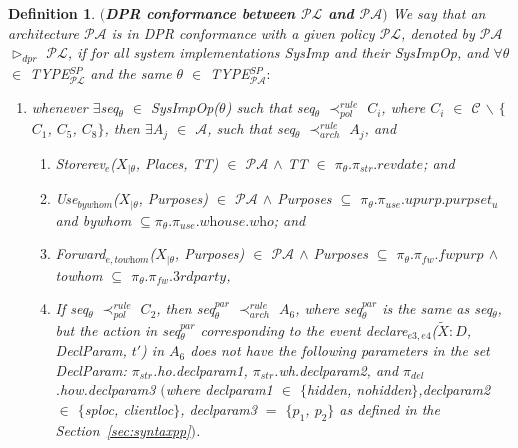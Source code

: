 \documentclass[a4paper]{article}
\newtheorem{ttd}{Definition}
\begin{document}
\begin{ttd}$($\textbf{DPR conformance between $\mathcal{P}\mathcal{L}$ and $\mathcal{P}\mathcal{A}$}$)$
\label{paplconform}
\noindent We say that an architecture $\mathcal{P}\mathcal{A}$ is in DPR conformance with a given policy $\mathcal{P}\mathcal{L}$, denoted by $\mathcal{P}\mathcal{A}$ $\triangleright_{dpr}$ $\mathcal{P}\mathcal{L}$, if for all system implementations \textit{SysImp} and their \textit{SysImpOp},  and $\forall$$\theta$ $\in$ \textit{TYPE}$^{SP}_{\mathcal{P}\mathcal{L}}$ and the same  $\theta$ $\in$ \textit{TYPE}$^{SP}_{\mathcal{P}\mathcal{A}}$$:$
\begin{enumerate}
\item  whenever $\exists$\textit{seq}$_\theta$ $\in$ \textit{SysImpOp}($\theta$) such that \textit{seq}$_\theta$ $\prec^{rule}_{pol}$ $C_i$,  where 
$C_i$ $\in$ $\mathcal{C}$ $\backslash$ $\{$$C_1$, $C_5$, $C_8$$\}$, then 
$\exists$$A_j$ $\in$  $\mathcal{A}$, such that \textit{seq}$_\theta$ $\prec^{rule}_{arch}$ $A_j$, and 

\begin{enumerate}
\item \textit{Storerev}$_{e}$($X_{|\theta}$, \textit{Places}, \textit{TT}) $\in$ $\mathcal{P}\mathcal{A}$ $\wedge$  \textit{TT} $\in$ $\pi_{\theta}.\pi_{str}.\textit{revdate}$; and  
\item \textit{Use}$_{\textit{bywhom}}$($X_{|\theta}$, \textit{Purposes}) $\in$ $\mathcal{P}\mathcal{A}$ $\wedge$ \textit{Purposes} $\subseteq$ $\pi_{\theta}.\pi_{use}.upurp.purpset_u$
and \textit{bywhom} $\subseteq \pi_{\theta}.\pi_{use}.\textit{whouse}.\textit{who}$; and

\item \textit{Forward}$_{e,\textit{towhom}}$($X_{|\theta}$, \textit{Purposes}) $\in$ $\mathcal{P}\mathcal{A}$ $\wedge$ \textit{Purposes} $\subseteq$ $\pi_{\theta}.\pi_{fw}.\textit{fwpurp}$ 
$\wedge$  \textit{towhom} $\subseteq$ $\pi_{\theta}.\pi_{fw}.\textit{3rdparty}$,
\item If \textit{seq}$_\theta$ $\prec^{rule}_{pol}$ $C_2$, then \textit{seq}$^{par}_\theta$ $\prec^{rule}_{arch}$ $A_6$, where \textit{seq}$^{par}_\theta$ is the same as \textit{seq}$_\theta$, but the action  in \textit{seq}$^{par}_\theta$ corresponding to the event \textit{declare}$_{e3,e4}$($\tilde{X}$$:$$D$, \textit{DeclParam}, $t'$) in $A_6$ does not have the following parameters in the set \textit{DeclParam}: $\pi_{str}$.\textit{ho}.\textit{declparam1}, $\pi_{str}$.\textit{wh}.\textit{declparam2}, and $\pi_{del}$.\textit{how}.\textit{declparam3} $($where \textit{declparam1} $\in$ $\{$\textit{hidden}, \textit{nohidden}$\}$,\textit{declparam2} $\in$ $\{$\textit{sploc}, \textit{clientloc}$\}$, \textit{declparam3} $=$ $\{$$p_1$, $p_2$$\}$ as defined in the Section~\ref{sec:syntaxpp}$)$.      
\end{enumerate} 
\end{enumerate}   
\end{ttd}
\end{document}
